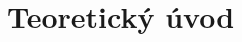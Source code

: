 \documentclass{protokol}
\begin{document}
	\maketitle

	\section{Teoretický úvod}
		
		
		
		



\end{document}
